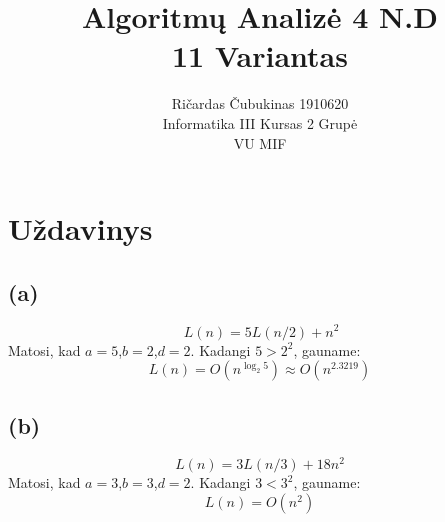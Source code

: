 \documentclass[a4paper,lithuanian]{article}
\title{Algoritmų Analizė 4 N.D\\11 Variantas}
\author{
  Ričardas Čubukinas 1910620\\
  Informatika III Kursas 2 Grupė\\
  VU MIF
}
\begin{document}
\maketitle

\section{Uždavinys}
\subsection*{(a)}
\[~L(n)=5L(n/2)+n^2\]
Matosi, kad $a=5$,$b=2$,$d=2$. Kadangi $5 > 2^2$, gauname:
\[L(n)=O(n^{\log_2{5}})\approx{}O(n^{2.3219})\]
\subsection*{(b)}
\[L(n)=3L(n/3)+18n^2\]
Matosi, kad $a=3$,$b=3$,$d=2$. Kadangi $3 < 3^2$, gauname:
\[L(n)=O(n^2)\]
\end{document}
